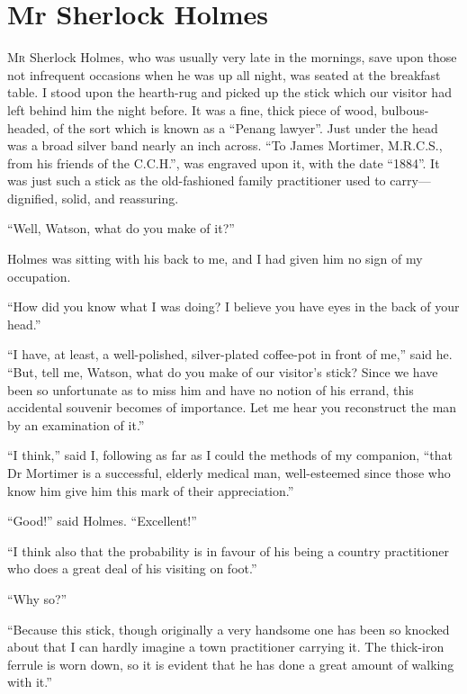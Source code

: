 \documentclass[paper=a5,BCOR=7mm,twoside,DIV=calc,12pt,usegeometry,openany,chapterprefix,endperiod,headings=big]{scrbook} %
\begin{document}
\chapter{Mr Sherlock Holmes}
\lettrine[lines=1]{M}{r} Sherlock Holmes, who was usually very late in the mornings, save upon those not infrequent occasions when he was up all night, was seated at the breakfast table. I stood upon the hearth-rug and picked up the stick which our visitor had left behind him the night before. It was a fine, thick piece of wood, bulbous-headed, of the sort which is known as a \enquote{Penang lawyer}. Just under the head was a broad silver band nearly an inch across. \enquote{To James Mortimer, M.R.C.S., from his friends of the C.C.H.}, was engraved upon it, with the date \enquote{1884}. It was just such a stick as the old-fashioned family practitioner used to carry---dignified, solid, and reassuring.

\enquote{Well, Watson, what do you make of it?}

Holmes was sitting with his back to me, and I had given him no sign of my occupation.

\enquote{How did you know what I was doing? I believe you have eyes in the back of your head.}

\enquote{I have, at least, a well-polished, silver-plated coffee-pot in front of me,} said he. \enquote{But, tell me, Watson, what do you make of our visitor's stick? Since we have been so unfortunate as to miss him and have no notion of his errand, this accidental souvenir becomes of importance. Let me hear you reconstruct the man by an examination of it.}

\enquote{I think,} said I, following as far as I could the methods of my companion, \enquote{that Dr Mortimer is a successful, elderly medical man, well-esteemed since those who know him give him this mark of their appreciation.}

\enquote{Good!} said Holmes. \enquote{Excellent!}

\enquote{I think also that the probability is in favour of his being a country practitioner who does a great deal of his visiting on foot.}

\enquote{Why so?}

\enquote{Because this stick, though originally a very handsome one has been so knocked about that I can hardly imagine a town practitioner carrying it. The thick-iron ferrule is worn down, so it is evident that he has done a great amount of walking with it.}
\end{document}

